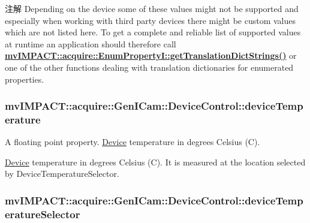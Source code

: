 \begin{DoxyNote}{注解}
Depending on the device some of these values might not be supported and especially when working with third party devices there might be custom values which are not listed here. To get a complete and reliable list of supported values at runtime an application should therefore call {\bfseries \hyperlink{classmv_i_m_p_a_c_t_1_1acquire_1_1_enum_property_i_a0ba6ccbf5ee69784d5d0b537924d26b6}{mv\+I\+M\+P\+A\+C\+T\+::acquire\+::\+Enum\+Property\+I\+::get\+Translation\+Dict\+Strings()}} or one of the other functions dealing with translation dictionaries for enumerated properties. 
\end{DoxyNote}
\hypertarget{classmv_i_m_p_a_c_t_1_1acquire_1_1_gen_i_cam_1_1_device_control_ae76cb8bd59c648976155dcfd93c03bd4}{
\subsubsection[{device\+Temperature}]{ mv\+I\+M\+P\+A\+C\+T\+::acquire\+::\+Gen\+I\+Cam\+::\+Device\+Control\+::device\+Temperature}}\label{classmv_i_m_p_a_c_t_1_1acquire_1_1_gen_i_cam_1_1_device_control_ae76cb8bd59c648976155dcfd93c03bd4}


A floating point property. \hyperlink{classmv_i_m_p_a_c_t_1_1acquire_1_1_device}{Device} temperature in degrees Celsius (C). 

\hyperlink{classmv_i_m_p_a_c_t_1_1acquire_1_1_device}{Device} temperature in degrees Celsius (C). It is measured at the location selected by Device\+Temperature\+Selector. \hypertarget{classmv_i_m_p_a_c_t_1_1acquire_1_1_gen_i_cam_1_1_device_control_ae11bd1ccc67e69edd3e666c79fff778d}{
\subsubsection[{device\+Temperature\+Selector}]{ mv\+I\+M\+P\+A\+C\+T\+::acquire\+::\+Gen\+I\+Cam\+::\+Device\+Control\+::device\+Temperature\+Selector}}\label{classmv_i_m_p_a_c_t_1_1acquire_1_1_gen_i_cam_1_1_device_control_ae11bd1ccc67e69edd3e666c79fff778d}


